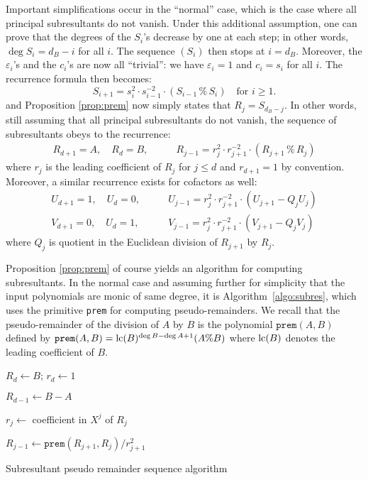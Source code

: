\documentclass{article}
\begin{document}
Important simplifications occur in the ``normal'' case, which is the 
case where all principal subresultants do not vanish. Under this 
additional assumption, one can prove that the degrees of the $S_i$'s 
decrease by one at each step; in other words, $\deg S_i = d_B - i$ for 
all $i$. The sequence $(S_i)$ then stops at $i = d_B$. Moreover, the 
$\varepsilon_i$'s and the $c_i$'s are now all ``trivial'': we have 
$\varepsilon_i = 1$ and $c_i = s_i$ for all $i$. The recurrence formula 
then becomes:
$$S_{i+1} = s_i^2 \cdot s_{i-1}^{-2}
\cdot (S_{i-1} \,\%\, S_i) \quad \text{for } i \geq 1.$$
and Proposition \ref{prop:prem} now simply states that $R_j = 
S_{d_B-j}$. In other words, still assuming that all principal 
subresultants do not vanish, the sequence of subresultants obeys to the 
recurrence:
\begin{align}
\label{eq:recRj}
R_{d+1} = A, \quad R_d = B, & \qquad
R_{j-1} = r_j^2 \cdot r_{j+1}^{-2}
\cdot (R_{j+1} \,\%\, R_j) 
\end{align}
where $r_j$ is the leading coefficient of $R_j$ for $j \leq d$ and $r_{d+1}
= 1$ by convention. Moreover, a similar 
recurrence exists for cofactors as well:
\begin{align}
U_{d+1} = 1, \quad U_d = 0, & \qquad
U_{j-1} = r_j^2 \cdot r_{j+1}^{-2}
\cdot (U_{j+1} - Q_j U_j) \label{eq:recUj} \\
V_{d+1} = 0, \quad U_d = 1, &\qquad
V_{j-1} = r_j^2 \cdot r_{j+1}^{-2}
\cdot (V_{j+1} - Q_j V_j) \label{eq:recVj}
\end{align}
where $Q_j$ is quotient in the Euclidean division of $R_{j+1}$ by $R_j$.

Proposition \ref{prop:prem} of course yields an algorithm for computing 
subresultants. In the normal case and assuming further for simplicity 
that the input polynomials are monic of same degree, it is 
Algorithm~\ref{algo:subres}, which uses the primitive \texttt{prem} for 
computing pseudo-remainders. We recall that the pseudo-remainder of the 
division of $A$ by $B$ is the polynomial $\texttt{prem}(A,B)$ defined by 
$\texttt{prem}(A,B) = \text{\rm lc}(B)^{\deg B-\deg A+1} (A \% B)$ where $\text{\rm lc}(B)$ 
denotes the leading coefficient of $B$.

\begin{algorithm}

  \BlankLine

  $R_d \leftarrow B$; $r_d \leftarrow 1$

  $R_{d-1} \leftarrow B-A$

    {$r_j \leftarrow$ coefficient in $X^j$ of $R_j$


     $R_{j-1} \leftarrow \texttt{prem}(R_{j+1}, R_j) / r_{j+1}^2$
    }

\caption{Subresultant pseudo remainder sequence algorithm}
\label{algo:subres}
\end{algorithm}
\end{document}
